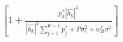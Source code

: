 \documentclass[preview]{standalone}
\begin{document}
\begin{align*}
\left[1 + \frac{p_k^\ast \left|\hat{h_k}\right|^2}{\left|\hat{h_k}\right|^2 \sum_{j=1}^{K-1} {p_j^\ast} + P \sigma_{\epsilon}^2 + w_B^\ast \sigma^2}\right]
\end{align*}
\end{document}

